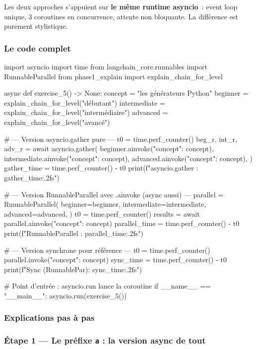 \documentclass[11pt,a4paper]{article}
\begin{document}
Les deux approches s'appuient sur \textbf{le même runtime asyncio}~:
event loop unique, 3 coroutines en concurrence, attente non bloquante.
La différence est purement stylistique.

\subsubsection{Le code complet}

\begin{pythoncode}
import asyncio
import time
from langchain_core.runnables import RunnableParallel
from phase1_explain import explain_chain_for_level


async def exercise_5() -> None:
    concept      = "les générateurs Python"
    beginner     = explain_chain_for_level("débutant")
    intermediate = explain_chain_for_level("intermédiaire")
    advanced     = explain_chain_for_level("avancé")

    # --- Version asyncio.gather pure ---
    t0 = time.perf_counter()
    beg_r, int_r, adv_r = await asyncio.gather(
        beginner.ainvoke({"concept": concept}),
        intermediate.ainvoke({"concept": concept}),
        advanced.ainvoke({"concept": concept}),
    )
    gather_time = time.perf_counter() - t0
    print(f"asyncio.gather    : {gather_time:.2f}s")

    # --- Version RunnableParallel avec .ainvoke (async aussi) ---
    parallel = RunnableParallel(
        beginner=beginner, intermediate=intermediate, advanced=advanced,
    )
    t0 = time.perf_counter()
    results = await parallel.ainvoke({"concept": concept})
    parallel_time = time.perf_counter() - t0
    print(f"RunnableParallel  : {parallel_time:.2f}s")

    # --- Version synchrone pour référence ---
    t0 = time.perf_counter()
    parallel.invoke({"concept": concept})
    sync_time = time.perf_counter() - t0
    print(f"Sync (RunnablePar): {sync_time:.2f}s")


# Point d'entrée : asyncio.run lance la coroutine
if __name__ == "__main__":
    asyncio.run(exercise_5())
\end{pythoncode}

\subsubsection{Explications pas à pas}

\subsubsection*{Étape 1 — Le préfixe \texttt{a} : la version async de tout}
\end{document}
